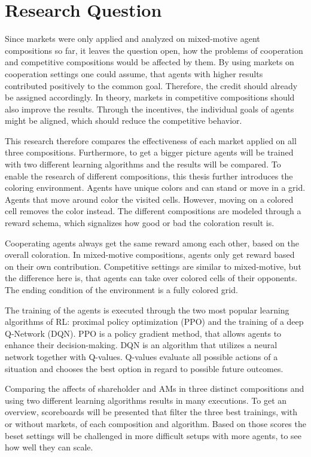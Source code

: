 \section{Research Question}

Since markets were only applied and analyzed on mixed-motive agent compositions so far, it leaves the question open, how the problems of cooperation and competitive compositions would be affected by them. By using markets on cooperation settings one could assume, that agents with higher results contributed positively to the common goal. Therefore, the credit should already be assigned accordingly. In theory, markets in competitive compositions should also improve the results. Through the incentives, the individual goals of agents might be aligned, which should reduce the competitive behavior.

This research therefore compares the effectiveness of each market applied on all three compositions. Furthermore, to get a bigger picture agents will be trained with two different learning algorithms and the results will be compared. To enable the research of different compositions, this thesis further introduces the coloring environment. Agents have unique colors and can stand or move in a grid. Agents that move around color the visited cells. However, moving on a colored cell removes the color instead. The different compositions are modeled through a reward schema, which signalizes how good or bad the coloration result is. 

Cooperating agents always get the same reward among each other, based on the overall coloration. In mixed-motive compositions, agents only get reward based on their own contribution. Competitive settings are similar to mixed-motive, but the difference here is, that agents can take over colored cells of their opponents. The ending condition of the environment is a fully colored grid.

The training of the agents is executed through the two most popular learning algorithms of RL: proximal policy optimization (PPO) and the training of a deep Q-Network (DQN). PPO is a policy gradient method, that allows agents to enhance their decision-making. DQN is an algorithm that utilizes a neural network together with Q-values. Q-values evaluate all possible actions of a situation and chooses the best option in regard to possible future outcomes.

Comparing the affects of shareholder and AMs in three distinct compositions and using two different learning algorithms results in many executions. To get an overview, scoreboards will be presented that filter the three best trainings, with or without markets, of each composition and algorithm. Based on those scores the beset settings will be challenged in more difficult setups with more agents, to see how well they can scale.

